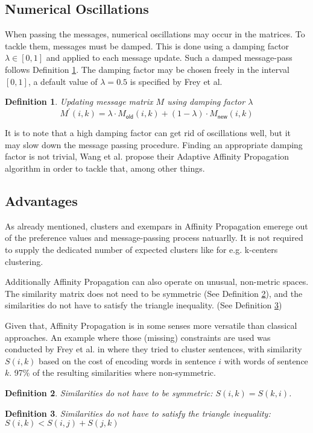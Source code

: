 \documentclass[11pt,a4paper]{article}
\newtheorem{definition}{Definition}
\begin{document}
\subsection{Numerical Oscillations}
When passing the messages, numerical oscillations may occur in the matrices. To tackle them, messages must be damped. This is done using a damping factor $\lambda \in \left[0,1\right]$ and applied to each message update. Such a damped message-pass follows Definition \ref{def:dampupdate}. The damping factor may be chosen freely in the interval $[0,1]$, a default value of $\lambda = 0.5$ is specified by Frey et al. \cite{frey2007clustering}
\begin{definition}\label{def:dampupdate}
	Updating message matrix $M$ using damping factor $\lambda$
	\[
		M^\prime (i,k) =\lambda \cdot M_{\mathsf{old}}(i,k) + (1-\lambda) \cdot M_{\mathsf{new}} (i,k)
	\]
\end{definition}
It is to note that a high damping factor can get rid of oscillations well, but it may slow down the message passing procedure.\cite{wang2008adaptive} Finding an appropriate damping factor is not trivial, Wang et al. propose their Adaptive Affinity Propagation algorithm in order to tackle that, among other things.\cite{wang2008adaptive}
\pagebreak
\subsection{Advantages}
As already mentioned, clusters and exempars in Affinity Propagation emerege out of the preference values and message-passing process natuarlly. It is not required to supply the dedicated number of expected clusters like for e.g. k-centers clustering.\cite{frey2007clustering}

Additionally Affinity Propagation can also operate on unusual, non-metric spaces. The similarity matrix does not need to be symmetric (See Definition \ref{def:symmetric}), and the similarities do not have to satisfy the triangle inequality. (See Definition \ref{def:triangleieq})\cite{frey2007clustering}

Given that, Affinity Propagation is in some senses more versatile than classical approaches. An example where those (missing) constraints are used was conducted by Frey et al. in \cite{frey2007clustering} where they tried to cluster sentences, with similarity $S(i,k)$ based on the cost of encoding words in sentence $i$ with words of sentence $k$. 97\% of the resulting similarities where non-symmetric.\cite{frey2007clustering} 
\begin{definition}\label{def:symmetric}
	Similarities do not have to be symmetric: $S(i,k) = S(k,i)$.
\end{definition}
\begin{definition}\label{def:triangleieq}
	Similarities do not have to satisfy the triangle inequality: $S(i,k) < S(i,j) + S(j,k)$
\end{definition}
\end{document}
